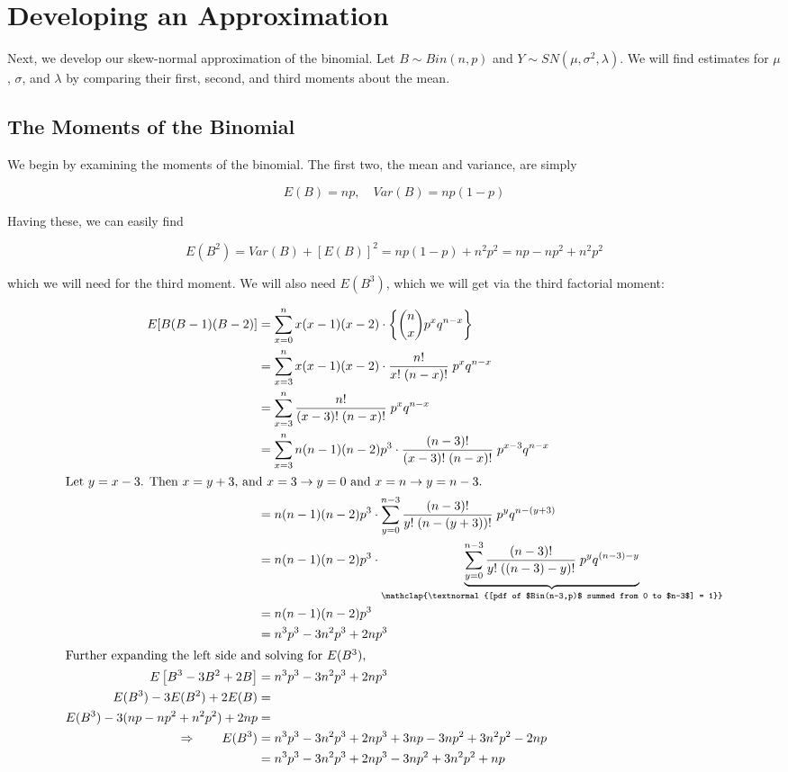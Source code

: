 \documentclass{article}
\begin{document}
\section{Developing an Approximation}

Next, we develop our skew-normal approximation of the binomial. Let $B \sim
Bin(n, p)$ and $Y \sim SN(\mu, \sigma^2, \lambda)$. We will find estimates for
$\mu$, $\sigma$, and $\lambda$ by comparing their first, second, and third
moments about the mean.

\subsection{The Moments of the Binomial}

We begin by examining the moments of the binomial. The first two, the mean and
variance, are simply

\begin{equation*}
  E(B) = np, \quad Var(B) = np(1-p)
\end{equation*}

Having these, we can easily find

\begin{equation*}
  E(B^2) = Var(B) + [E(B)]^2 = np(1-p) + n^2p^2 = np - np^2 + n^2p^2
\end{equation*}

which we will need for the third moment. We will also need $E(B^3)$, which we
will get via the third factorial moment:

\begin{align*}
  E[B(B-1)(B-2)] &= \sum_{x=0}^n x (x-1) (x-2) \cdot \left\{ \binom{n}{x} p^x q^{n-x} \right\} \\
  &= \sum_{x=3}^n x(x-1)(x-2) \cdot \frac{n!}{x!\;(n-x)!} \; p^x q^{n-x} \\
  &= \sum_{x=3}^n \frac{n!}{(x-3)!\;(n-x)!} \; p^x q^{n-x} \\
  &= \sum_{x=3}^n n(n-1)(n-2) p^3 \cdot \frac{(n-3)!}{(x-3)!\;(n-x)!} \; p^{x-3}q^{n-x} \\
  \intertext{Let $y=x-3$. Then $x=y+3$, and $x=3 \rightarrow y=0$ and $x=n \rightarrow y=n-3$.}
  &= n(n-1)(n-2)p^3 \cdot \sum_{y=0}^{n-3} \frac{(n-3)!}{y!\;(n-(y+3))!} \; p^y q^{n-(y+3)} \\
  &= n(n-1)(n-2)p^3 \cdot \underbrace {\sum_{y=0}^{n-3} \frac{(n-3)!}{y!\;((n-3)-y)!} \; p^y q^{(n-3)-y}}_{\mathclap{\textnormal{[pdf of $Bin(n-3,p)$ summed from 0 to $n-3$] = 1}}} \\
  &= n(n-1)(n-2)p^3 \\
  &= n^3p^3 - 3n^2p^3 + 2np^3 \\
  \intertext{Further expanding the left side and solving for $E(B^3)$,}
  E \left[ B^3 - 3B^2 + 2B \right] &= n^3p^3 - 3n^2p^3 + 2np^3 \\
  E(B^3) - 3E(B^2) + 2E(B) &= \\
  E(B^3) - 3(np - np^2 + n^2p^2) + 2np &= \\
  \Rightarrow \qquad E(B^3) &= n^3p^3 - 3n^2p^3 + 2np^3 + 3np - 3np^2 + 3n^2p^2 - 2np \\
  &= n^3p^3 - 3n^2p^3 + 2np^3 - 3np^2 + 3n^2p^2 + np
\end{align*}
\end{document}
